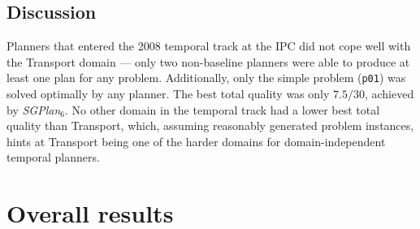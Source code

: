 \subsection{Discussion}

Planners that entered the 2008 temporal track at the IPC did not cope well with the Transport domain
--- only two non-baseline planners were able to produce at least one plan
for any problem. Additionally, only the simple problem (\verb+p01+) was solved
optimally by any planner. The best total quality was only $7.5/30$, achieved by
\textit{SGPlan$_6$}. No other domain in the temporal track had a lower best total quality
than Transport, which, assuming reasonably generated problem instances, hints
at Transport being one of the harder domains for domain-independent temporal planners.




\section{Overall results}

